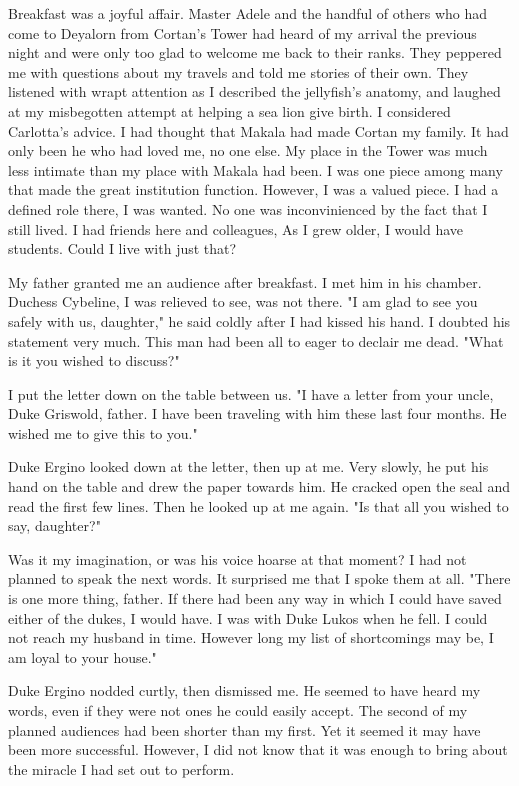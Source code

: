 \documentclass{article}
\begin{document}
Breakfast was a joyful affair. Master Adele and the handful of others who had come to Deyalorn from Cortan's Tower had heard of my arrival the previous night and were only too glad to welcome me back to their ranks. They peppered me with questions about my travels and told me stories of their own. They  listened with wrapt attention as I described the jellyfish's anatomy, and laughed at my misbegotten attempt at helping a sea lion give birth. I considered Carlotta's advice. I had thought that Makala had made Cortan my family. It had only been he who had loved me, no one else. My place in the Tower was much less intimate than my place with Makala had been. I was one piece among many that made the great institution function. However, I was a valued piece. I had a defined role there, I was wanted. No one was inconvinienced by the fact that I still lived. I had friends here and colleagues, As I grew older, I would have students. Could I live with just that?

\vspace{.5cm}

My father granted me an audience after breakfast. I met him in his chamber. Duchess Cybeline, I was relieved to see, was not there. "I am glad to see you safely with us, daughter," he said coldly after I had kissed his hand. I doubted his statement very much. This man had been all to eager to declair me dead. "What is it you wished to discuss?"

I put the letter down on the table between us. "I have a letter from your uncle, Duke Griswold, father. I have been traveling with him these last four months. He wished me to give this to you."

Duke Ergino looked down at the letter, then up at me. Very slowly, he put his hand on the table and drew the paper towards him. He cracked open the seal and read the first few lines. Then he looked up at me again. "Is that all you wished to say, daughter?"

Was it my imagination, or was his voice hoarse at that moment? I had not planned to speak the next words. It surprised me that I spoke them at all. "There is one more thing, father. If there had been any way in which I could have saved either of the dukes, I would have. I was with Duke Lukos when he fell. I could not reach my husband in time. However long my list of shortcomings may be, I am loyal to your house."

Duke Ergino nodded curtly, then dismissed me. He seemed to have heard my words, even if they were not ones he could easily accept. The second of my planned audiences had been shorter than my first. Yet it seemed it may have been more successful. However, I did not know that it was enough to bring about the miracle I had set out to perform.
\end{document}
